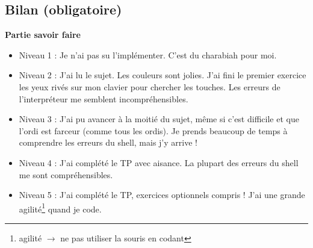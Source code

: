 \newpage

\subsection{Bilan (obligatoire)}






\textbf{Partie savoir faire}
\begin{itemize}
    \item Niveau 1 : Je n'ai pas su l'implémenter. C'est du charabiah pour moi. 
    \item Niveau 2 : J'ai lu le sujet. Les couleurs sont jolies. J'ai fini le premier exercice les yeux rivés sur mon clavier pour chercher les touches. Les erreurs de l'interpréteur me semblent incompréhensibles.
    \item Niveau 3 : J'ai pu avancer à la moitié du sujet, même si c'est difficile et que l'ordi est farceur (comme tous les ordis). Je prends beaucoup de temps à comprendre les erreurs du shell, mais j'y arrive !
    \item Niveau 4 : J'ai complété le TP avec aisance. La plupart des erreurs du shell me sont compréhensibles.
    \item Niveau 5 : J'ai complété le TP, exercices optionnels compris ! J'ai une grande agilité\footnote{agilité $\rightarrow$ ne pas utiliser la souris en codant} quand je code. 
\end{itemize}


